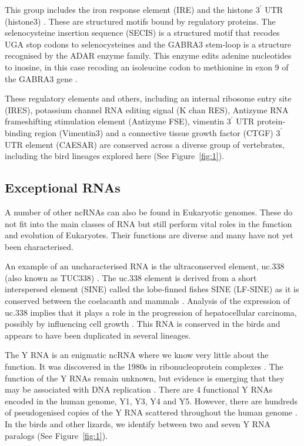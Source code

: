 \documentclass[10pt]{bmc_article}
\newenvironment{bmcformat}{\begin{raggedright}\baselineskip20pt\sloppy\setboolean{publ}{false}}{\end{raggedright}\baselineskip20pt\sloppy}
\begin{document}
\begin{bmcformat}
This group includes the iron response element (IRE) \cite{Stevens:}
and the histone $3^\prime$ UTR (histone3)
\cite{Davila_Lopez:2008a}. These are structured motifs bound by
regulatory proteins. The selenocysteine insertion sequence (SECIS) is
a structured motif that recodes UGA stop codons to selenocysteines
\cite{Lambert:2002} and the GABRA3 stem-loop is a structure recognised
by the ADAR enzyme family. This enzyme edits adenine nucleotides to
inosine, in this case recoding an isoleucine codon to methionine in
exon 9 of the GABRA3 gene \cite{Ohlson:2007}.

These regulatory elements and others, including an internal ribosome
entry site (IRES), potassium channel RNA editing signal (K chan RES),
Antizyme RNA frameshifting stimulation element (Antizyme FSE),
vimentin $3^\prime$ UTR protein-binding region (Vimentin3) and a
connective tissue growth factor (CTGF) $3^\prime$ UTR element (CAESAR)
are conserved across a diverse group of vertebrates, including the
bird lineages explored here (See Figure~\ref{fig:1}).

\subsection*{Exceptional RNAs}


A number of other ncRNAs can also be found in Eukaryotic
genomes. These do not fit into the main classes of RNA but still
perform vital roles in the function and evolution of Eukaryotes.
Their functions are diverse and many have not yet been characterised.

An example of an uncharacterised RNA is the ultraconserved element,
uc.338 (also known as TUC338)
\cite{Bejerano:2004,Bejerano:2006,Braconi:2011}. The uc.338 element
is derived from a short interspersed element (SINE) called the
lobe-finned fishes SINE (LF-SINE) as it is conserved between the
coelacanth and mammals \cite{Bejerano:2006}. Analysis of the
expression of uc.338 implies that it plays a role in the progression
of hepatocellular carcinoma, possibly by influencing cell growth
\cite{Braconi:2011}. This RNA is conserved in the birds and appears to
have been duplicated in several lineages.

The Y RNA is an enigmatic ncRNA where we know very little about the
function. It was discovered in the 1980s in ribonucleoprotein
complexes \cite{Lerner:1981}. The function of the Y RNAs remain
unknown, but evidence is emerging that they may be associated with DNA
replication \cite{Christov:2006}. There are 4 functional Y RNAs
encoded in the human genome, Y1, Y3, Y4 and Y5. However, there are
hundreds of pseudogenised copies of the Y RNA scattered throughout the
human genome \cite{Mosig:2007}. In the birds and other lizards, we
identify between two and seven Y RNA paralogs (See
Figure~\ref{fig:1}).


\end{bmcformat}
\end{document}
